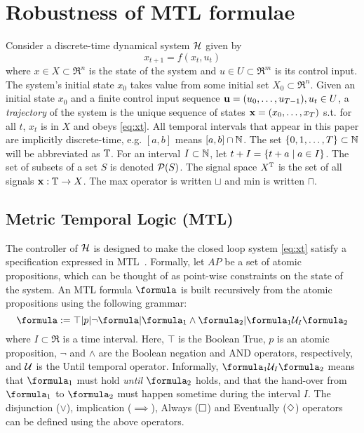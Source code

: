 \section{Robustness of MTL formulae}
\label{sec:robust semantics}

Consider a discrete-time dynamical system $\mathcal{H}$ given by 
\begin{equation}
\label{eq:xt}
x_{t+1} = f(x_t,u_t)
\end{equation}
where $x \in X \subset \Re^n$ is the state of the system and $u \in U \subset \Re^m$ is its control input.
The system's initial state $x_0$ takes value from some initial set $X_0 \subset \Re^n$.
Given an initial state $x_0$ and a finite control input sequence $\mathbf{u} = (u_0,\ldots, u_{T-1}), u_t \in U$, a \textit{trajectory} of the system is the unique sequence of states $\mathbf{x} = (x_0,\ldots,x_T)$ s.t. for all $t$, $x_t$ is in $X$ and obeys \eqref{eq:xt}.
All temporal intervals that appear in this paper are implicitly discrete-time, e.g. $[a,b]$ means $[a,b] \cap \mathbb{N}$. 
The set $\{0,1,\ldots,T\}\subset \mathbb{N}$ will be abbreviated as $\mathbb{T}$.
For an interval $I \subset \mathbb{N}$, let $t+I = \{t+a \;|\; a \in I\}$.
The set of subsets of a set $S$ is denoted $\mathcal{P}(S)$.
The signal space $X^{\mathbb{T}}$ is the set of all signals $\mathbf{x}: \mathbb{T} \rightarrow X$.
The max operator is written $\sqcup$ and min is written $\sqcap$.

\subsection{Metric Temporal Logic (MTL)}
\label{sec:mtl}
The controller of $\mathcal{H}$ is designed to make the closed loop system \eqref{eq:xt} satisfy a specification expressed in MTL~\cite{Ouaknine08_RecentResultsMTL}.
Formally, let $AP$ be a set of atomic propositions, which can be thought of as point-wise constraints on the state of the system.
An MTL formula $\formula$ is built recursively from the atomic propositions using the following grammar:
\[\formula \defeq \top|p|\neg \formula | \formula_1 \land \formula_2 | \formula_1 \until_I \formula_2\]
where $I \subset \Re$ is a time interval.
Here, $\top$ is the Boolean True, $p$ is an atomic proposition, $\neg$ and $\land$ are the Boolean negation and AND operators, respectively, and $\mathcal{U}$ is the Until temporal operator.
Informally, $\formula_1 \until_I \formula_2$ means that $\formula_1$ must hold \textit{until} $\formula_2$ holds, and that the hand-over from $\formula_1$  to $\formula_2$ must happen sometime during the interval $I$.
The disjunction ($\lor$), implication ($\implies$), Always ($\square$) and Eventually ($\Diamond$) operators can be defined using the above operators.

